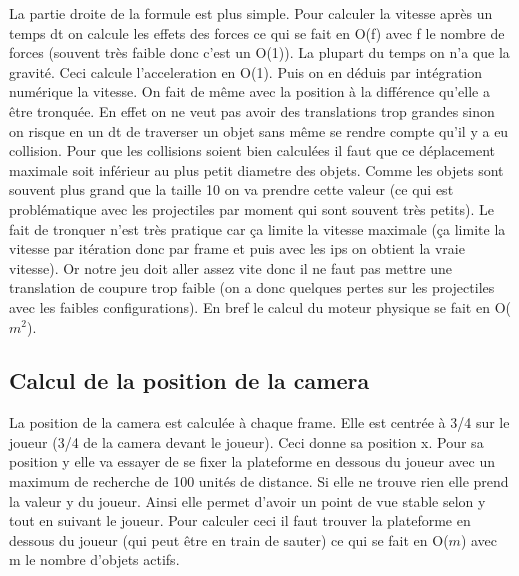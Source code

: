 \documentclass[11pt]{article}
\begin{document}
\indent La partie droite de la formule est plus simple. Pour calculer la vitesse après un temps dt on calcule les effets des forces ce qui se fait en O(f) avec f le nombre de forces (souvent très faible donc c'est un O(1)). La plupart du temps on n'a que la gravité. Ceci calcule l'acceleration en O(1). Puis on en déduis par intégration numérique la vitesse. On fait de même avec la position à la différence qu'elle a être tronquée. En effet on ne veut pas avoir des translations trop grandes sinon on risque en un dt de traverser un objet sans même se rendre compte qu'il y a eu collision. Pour que les collisions soient bien calculées il faut que ce déplacement maximale soit inférieur au plus petit diametre des objets. Comme les objets sont souvent plus grand que la taille 10 on va prendre cette valeur (ce qui est problématique avec les projectiles par moment qui sont souvent très petits). Le fait de tronquer n'est très pratique car ça limite la vitesse maximale (ça limite la vitesse par itération donc par frame et puis avec les ips on obtient la vraie vitesse). Or notre jeu doit aller assez vite donc il ne faut pas mettre une translation de coupure trop faible (on a donc quelques pertes sur les projectiles avec les faibles configurations).
\indent En bref le calcul du moteur physique se fait en O($m^2$).


\subsection{Calcul de la position de la camera}
La position de la camera est calculée à chaque frame. Elle est centrée à 3/4 sur le joueur (3/4 de la camera devant le joueur). Ceci donne sa position x. Pour sa position y elle va essayer de se fixer la plateforme en dessous du joueur avec un maximum de recherche de 100 unités de distance. Si elle ne trouve rien elle prend la valeur y du joueur. Ainsi elle permet d'avoir un point de vue stable selon y tout en suivant le joueur. Pour calculer ceci il faut trouver la plateforme en dessous du joueur (qui peut être en train de sauter) ce qui se fait en O($m$) avec m le nombre d'objets actifs.
\end{document}
